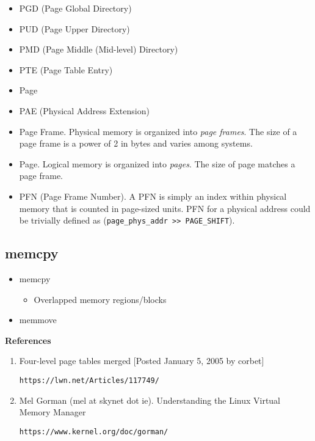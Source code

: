 \documentclass[12pt,a4paper]{article}
\begin{document}
\begin{itemize}
\item PGD (Page Global Directory)
\item PUD (Page Upper Directory)
\item PMD (Page Middle (Mid-level) Directory)
\item PTE (Page Table Entry)
\item Page
\end{itemize}

\begin{itemize}
\item PAE (Physical Address Extension)
\item Page Frame.  Physical memory is organized into \emph{page frames}.  The 
size of a page frame is a power of 2 in bytes and varies among systems.
\item Page.  Logical memory is organized into \emph{pages}. The size of page 
matches a page frame.
\item PFN (Page Frame Number).  A PFN is simply an index within physical memory 
that is counted in page-sized units. PFN for a physical address could be 
trivially defined as (\verb"page_phys_addr >> PAGE_SHIFT").
\end{itemize}

\subsection{memcpy}

\begin{itemize}
\item memcpy

	\begin{itemize}
	\item Overlapped memory regions/blocks
	\end{itemize}

\item memmove
\end{itemize}

\textbf{References}

\begin{enumerate}
\item Four-level page tables merged [Posted January 5, 2005 by corbet]

	\texttt{https://lwn.net/Articles/117749/}

\item Mel Gorman (mel at skynet dot ie).  Understanding the Linux Virtual Memory Manager

	\texttt{https://www.kernel.org/doc/gorman/}
\end{enumerate}
\end{document}
